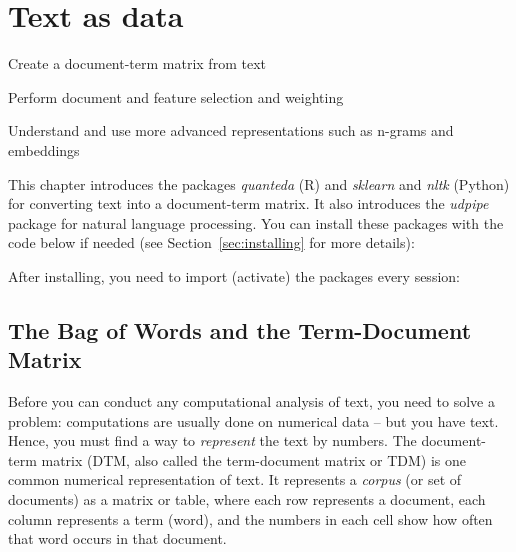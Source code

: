\chapter{Text as data}
\label{chap:dtm}

\begin{abstract}{Abstract}
  This chapter shows how you can analyze texts that are stored as a data frame column or variable using functions from the package \emph{quanteda} in R and the package \emph{sklearn} in Python and R.
  Please see Chapter~\ref{chap:protext} for more information on reading and cleaning text.

\end{abstract}


\begin{objectives}
\item Create a document-term matrix from text
\item Perform  document and feature selection and weighting
\item Understand and use more advanced representations such as n-grams and embeddings
\end{objectives}


\newpage
\begin{feature}
  This chapter introduces the packages \emph{quanteda} (R) and \emph{sklearn} and \emph{nltk} (Python) for converting text into a document-term matrix. It also introduces the \emph{udpipe} package for natural language processing.
You can install these packages with the code below if needed  (see Section~\ref{sec:installing} for more details):


\noindent After installing, you need to import (activate) the packages every session:


\end{feature}

%
\section{The Bag of Words and the Term-Document Matrix}
\label{sec:dtm}

Before you can conduct any computational analysis of text, you need to solve a problem: computations are usually done on numerical data -- but you have text. Hence, you must find a way to \emph{represent} the text by numbers.
The document-term matrix (DTM, also called the term-document matrix or TDM) is one common numerical representation of text.
It represents a \emph{corpus} (or set of documents) as a matrix or table, where each row represents a document, each column represents a term (word),
and the numbers in each cell show how often that word occurs in that document.

